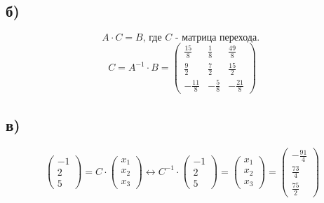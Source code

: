 	\subsection*{б)}
	$$A\cdot C = B\text{, где } C\text{ - матрица перехода. }$$
	$$C = A^{-1}\cdot B = 
	\begin{pmatrix}
		\frac{15}{8} & \frac18 & \frac{49}{8} \\
		\frac92 & \frac72 & \frac{15}{2} \\
		-\frac{11}{8} & -\frac{5}{8} & -\frac{21}{8}
	\end{pmatrix}$$
	\subsection*{в)}
	$$\begin{pmatrix}
		-1 \\
		2 \\
		5
	\end{pmatrix} = C\cdot \begin{pmatrix}
	x_1 \\
	x_2 \\
	x_3 
	\end{pmatrix}\leftrightarrow 
	C^{-1}\cdot\begin{pmatrix}
	-1 \\
	2 \\
	5
	\end{pmatrix} = \begin{pmatrix}
	x_1 \\
	x_2 \\
	x_3 
	\end{pmatrix} = \begin{pmatrix}
	-\frac{91}{4} \\
	\frac{73}{4} \\
	\frac{75}{2}
	\end{pmatrix} $$
